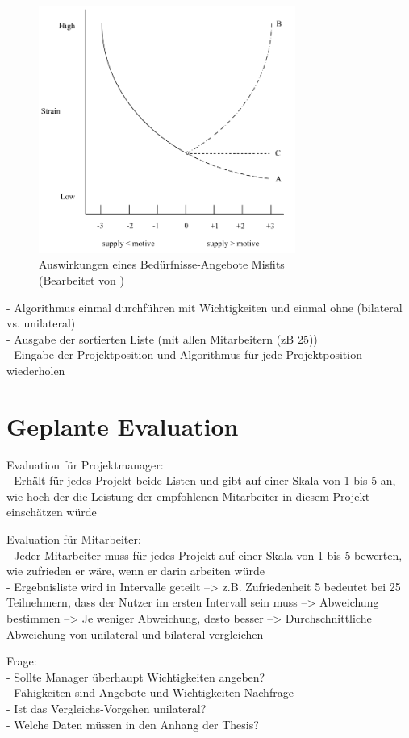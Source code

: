 \begin{figure}[h]
	\centering
	\includegraphics[width=0.75\textwidth]{gfx/ueberschuss_supply_motive.png}
	\caption{Auswirkungen eines Bedürfnisse-Angebote Misfits \cite[S. 23]{edwards:2008}\\(Bearbeitet von \myName)}
	\label{fig:methodik:abb2}
\end{figure}

- Algorithmus einmal durchführen mit Wichtigkeiten und einmal ohne (bilateral vs. unilateral)\\
- Ausgabe der sortierten Liste (mit allen Mitarbeitern (zB 25))\\
- Eingabe der Projektposition und Algorithmus für jede Projektposition wiederholen

\section{Geplante Evaluation}
\label{ch:methodik:evaluation}
Evaluation für Projektmanager:\\
- Erhält für jedes Projekt beide Listen und gibt auf einer Skala von 1 bis 5 an, wie hoch der die Leistung der empfohlenen Mitarbeiter in diesem Projekt einschätzen würde

Evaluation für Mitarbeiter:\\
- Jeder Mitarbeiter muss für jedes Projekt auf einer Skala von 1 bis 5 bewerten, wie zufrieden er wäre, wenn er darin arbeiten würde\\
- Ergebnisliste wird in Intervalle geteilt --> z.B. Zufriedenheit 5 bedeutet bei 25 Teilnehmern, dass der Nutzer im ersten Intervall sein muss --> Abweichung bestimmen --> Je weniger Abweichung, desto besser --> Durchschnittliche Abweichung von unilateral und bilateral vergleichen

Frage:\\
- Sollte Manager überhaupt Wichtigkeiten angeben?\\
	- Fähigkeiten sind Angebote und Wichtigkeiten Nachfrage\\
- Ist das Vergleichs-Vorgehen unilateral?\\
- Welche Daten müssen in den Anhang der Thesis?

